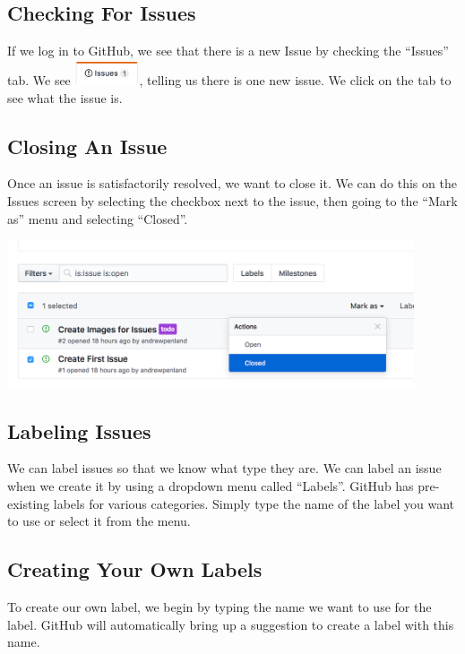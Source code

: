 \documentclass[11pt]{article}
\begin{document}
\subsection{Checking For Issues}

If we log in to GitHub, we see that there is a new Issue by checking the ``Issues'' tab. We see \includegraphics[width=0.75in]{IssuesLink}, telling us there is one new issue. We click on the tab to see what the issue is.

\subsection{Closing An Issue} 

Once an issue is satisfactorily resolved, we want to close it. We can do this on the Issues screen by selecting the checkbox next to the issue, then going to the ``Mark as'' menu and selecting ``Closed''.

\begin{center}
\includegraphics[width=0.9\textwidth]{MarkIssueClosed}
\end{center}

\subsection{Labeling Issues}

We can label issues so that we know what type they are. We can label an issue when we create it by using a dropdown menu called ``Labels''. GitHub has pre-existing labels for various categories. Simply type the name of the label you want to use or select it from the menu. 

\subsection{Creating Your Own Labels}

To create our own label, we begin by typing the name we want to use for the label. GitHub will automatically bring up a suggestion to create a label with this name.
\end{document}

